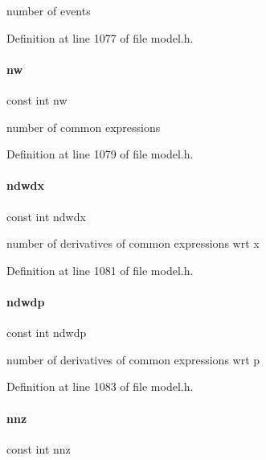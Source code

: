 number of events 

Definition at line 1077 of file model.\+h.

\mbox{\label{classamici_1_1_model_a196986a3a7c4a7dff1c90ae254db7795}} 
\paragraph{\texorpdfstring{nw}{nw}}
{\footnotesize\ttfamily const int nw}

number of common expressions 

Definition at line 1079 of file model.\+h.

\mbox{\label{classamici_1_1_model_a761315b22459d5ca307556f210aece6b}} 
\paragraph{\texorpdfstring{ndwdx}{ndwdx}}
{\footnotesize\ttfamily const int ndwdx}

number of derivatives of common expressions wrt x 

Definition at line 1081 of file model.\+h.

\mbox{\label{classamici_1_1_model_a1bd453ba21c508c3687f641d49430829}} 
\paragraph{\texorpdfstring{ndwdp}{ndwdp}}
{\footnotesize\ttfamily const int ndwdp}

number of derivatives of common expressions wrt p 

Definition at line 1083 of file model.\+h.

\mbox{\label{classamici_1_1_model_aab84622e454402438efd61cc36645abe}} 
\paragraph{\texorpdfstring{nnz}{nnz}}
{\footnotesize\ttfamily const int nnz}

